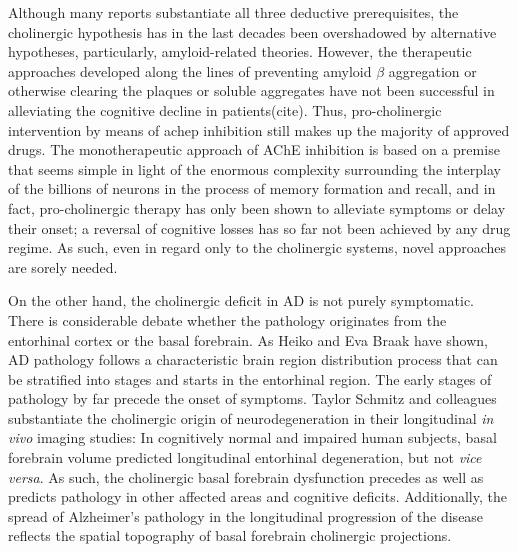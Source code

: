 Although many reports substantiate all three deductive prerequisites, the cholinergic hypothesis has in the last decades been overshadowed by alternative hypotheses, particularly, amyloid-related theories. However, the therapeutic approaches developed along the lines of preventing amyloid $\beta$ aggregation or otherwise clearing the plaques or soluble aggregates have not been successful in alleviating the cognitive decline in patients(cite). Thus, pro-cholinergic intervention by means of \ac{achep} inhibition still makes up the majority of approved drugs. The monotherapeutic approach of AChE inhibition is based on a premise that seems simple in light of the enormous complexity surrounding the interplay of the billions of neurons in the process of memory formation and recall, and in fact, pro-cholinergic therapy has only been shown to alleviate symptoms or delay their onset; a reversal of cognitive losses has so far not been achieved by any drug regime. As such, even in regard only to the cholinergic systems, novel approaches are sorely needed.

On the other hand, the cholinergic deficit in AD is not purely symptomatic. There is considerable debate whether the pathology originates from the entorhinal cortex or the basal forebrain. As Heiko and Eva Braak have shown\cite{Braak1995}, AD pathology follows a characteristic brain region distribution process that can be stratified into stages and starts in the entorhinal region. The early stages of pathology by far precede the onset of symptoms. Taylor Schmitz and colleagues substantiate the cholinergic origin of neurodegeneration in their longitudinal \emph{in vivo} imaging studies\cite{Schmitz2016, Schmitz2018}: In cognitively normal and impaired human subjects, basal forebrain volume predicted longitudinal entorhinal degeneration, but not \emph{vice versa}. As such, the cholinergic basal forebrain dysfunction precedes as well as predicts pathology in other affected areas and cognitive deficits\cite{Schmitz2016}. Additionally, the spread of Alzheimer's pathology in the longitudinal progression of the disease reflects the spatial topography of basal forebrain cholinergic projections\cite{Schmitz2018}.



